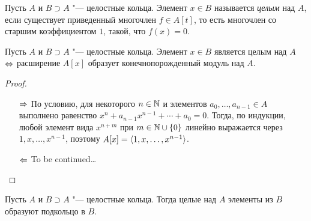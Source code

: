 \begin{definition}
	Пусть $A$ и $B \supset A$ "--- целостные кольца. Элемент $x \in B$ называется \textit{целым} над $A$, если существует приведенный многочлен $f \in A[t]$, то есть многочлен со старшим коэффициентом $1$, такой, что $f(x) = 0$.
\end{definition}

\begin{theorem}
	Пусть $A$ и $B \supset A$ "--- целостные кольца. Элемент $x \in B$ является целым над $A$ $\Leftrightarrow$ расширение $A[x]$ образует конечнопорожденный модуль над $A$.
\end{theorem}

\begin{proof}~
	\begin{enumerate}
		\item[$\Rightarrow$] По условию, для некоторого $n \in \mathbb{N}$ и элементов $a_0, \dotsc, a_{n - 1} \in A$ выполнено равенство $x^n + a_{n-1}x^{n-1} + \dotsb + a_0 = 0$. Тогда, по индукции, любой элемент вида $x^{n + m}$ при $m \in \mathbb{N} \cup \{0\}$ линейно выражается через $1, x, \dotsc, x^{n- 1}$, поэтому $A[x] = \langle1, x, \dotsc, x^{n- 1}\rangle$.
		\item[$\Leftarrow$]To be continued\dots\qedhere
	\end{enumerate}
\end{proof}

\begin{corollary}
	Пусть $A$ и $B \supset A$ "--- целостные кольца. Тогда целые над $A$ элементы из $B$ образуют подкольцо в $B$.
\end{corollary}